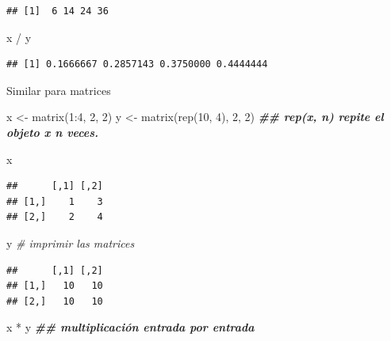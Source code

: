 \documentclass[
  12pt,
]{book}
\newenvironment{Shaded}{\begin{snugshade}}{\end{snugshade}}
\newcommand{\CommentTok}[1]{\textcolor[rgb]{0.56,0.35,0.01}{\textit{#1}}}
\newcommand{\DecValTok}[1]{\textcolor[rgb]{0.00,0.00,0.81}{#1}}
\newcommand{\DocumentationTok}[1]{\textcolor[rgb]{0.56,0.35,0.01}{\textbf{\textit{#1}}}}
\newcommand{\FunctionTok}[1]{\textcolor[rgb]{0.00,0.00,0.00}{#1}}
\newcommand{\NormalTok}[1]{#1}
\newcommand{\OtherTok}[1]{\textcolor[rgb]{0.56,0.35,0.01}{#1}}
\newcommand{\SpecialCharTok}[1]{\textcolor[rgb]{0.00,0.00,0.00}{#1}}
\begin{document}
\begin{verbatim}
## [1]  6 14 24 36
\end{verbatim}

\begin{Shaded}
\begin{Highlighting}[]
\NormalTok{x }\SpecialCharTok{/}\NormalTok{ y}
\end{Highlighting}
\end{Shaded}

\begin{verbatim}
## [1] 0.1666667 0.2857143 0.3750000 0.4444444
\end{verbatim}

Similar para matrices

\begin{Shaded}
\begin{Highlighting}[]
\NormalTok{x }\OtherTok{\textless{}{-}} \FunctionTok{matrix}\NormalTok{(}\DecValTok{1}\SpecialCharTok{:}\DecValTok{4}\NormalTok{, }\DecValTok{2}\NormalTok{, }\DecValTok{2}\NormalTok{)}
\NormalTok{y }\OtherTok{\textless{}{-}} \FunctionTok{matrix}\NormalTok{(}\FunctionTok{rep}\NormalTok{(}\DecValTok{10}\NormalTok{, }\DecValTok{4}\NormalTok{), }\DecValTok{2}\NormalTok{, }\DecValTok{2}\NormalTok{)  }\DocumentationTok{\#\# rep(x, n) repite el objeto x n veces.}

\NormalTok{x}
\end{Highlighting}
\end{Shaded}

\begin{verbatim}
##      [,1] [,2]
## [1,]    1    3
## [2,]    2    4
\end{verbatim}

\begin{Shaded}
\begin{Highlighting}[]
\NormalTok{y }\CommentTok{\# imprimir las matrices}
\end{Highlighting}
\end{Shaded}

\begin{verbatim}
##      [,1] [,2]
## [1,]   10   10
## [2,]   10   10
\end{verbatim}

\begin{Shaded}
\begin{Highlighting}[]
\NormalTok{x }\SpecialCharTok{*}\NormalTok{ y }\DocumentationTok{\#\# multiplicación entrada por entrada}
\end{Highlighting}
\end{Shaded}
\end{document}
